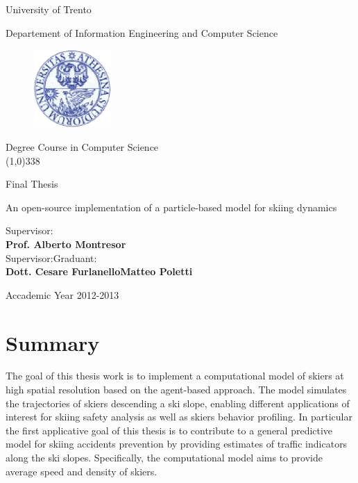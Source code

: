 \documentclass[12pt,a4paper,twoside]{book}
\begin{document}
\begin{titlepage}
  \begin{center}
    \begin{Large}University of Trento\\\end{Large}
     Departement of Information Engineering and Computer Science  \\
     \vspace{10pt}
     \begin{figure}[htbp]
       \begin{center}
         \includegraphics[width=3cm]{images/sigillo_unitn.eps}
       \end{center}
     \end{figure}
Degree Course in Computer Science\\

\vspace{10pt}
\line(1,0){338}
\vspace{10pt}

Final Thesis\\
\end{center}
\vspace{3cm}
\begin{center}
\begin{Large}An open-source implementation of a particle-based model for skiing dynamics\\\end{Large}
\vspace{3cm}
\end{center}
Supervisor: \\ \textbf{Prof. Alberto Montresor} \\
Supervisor:\hspace{7.76cm}Graduant:   \\
\textbf{Dott. Cesare Furlanello}\hspace{4.9cm}\textbf{Matteo Poletti}
\vspace{1cm}
\begin{center}
Accademic Year 2012-2013
\end{center}
\end{titlepage}

\chapter*{Summary}
The goal of this thesis work is to implement a computational model of skiers at high spatial resolution based on the agent-based approach. The model simulates the trajectories of skiers descending a ski slope, enabling different applications of interest for skiing safety analysis as well as skiers behavior profiling. In particular the first applicative goal of this thesis is to contribute to a general predictive model for skiing accidents prevention by providing estimates of traffic indicators along the ski slopes. Specifically, the computational model aims to provide average speed and density of skiers.
\end{document}
